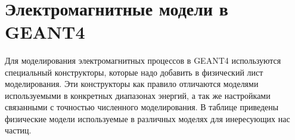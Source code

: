 ~\cite{bespalov2008, kolchuzkin1978, nemec1975}






  

\section{Электромагнитные модели в GEANT4 }\label{sec:theory/models}


Для моделирования электромагнитных процессов в GEANT4 используются специальный конструкторы, которые надо добавить в физический лист моделирования. Эти конструкторы как правило отличаются моделями используемыми в конкретных диапазонах энергий, а так же настройками связанными с точностью численного моделирования. В таблице приведены физические модели используемые в различных моделях для инересующих нас частиц.

